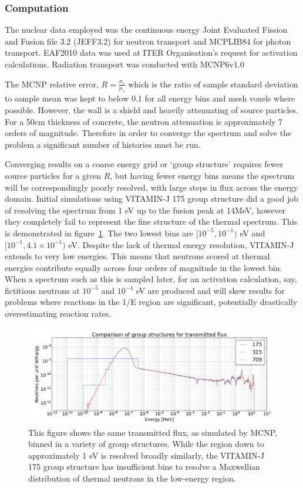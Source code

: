 \subsubsection{Computation}
\label{subsubsec:rad_tran_comp}
The nuclear data employed was the continuous energy Joint Evaluated Fission and Fusion file 3.2 (JEFF3.2) for neutron transport and MCPLIB84 for photon transport. EAF2010 data was used at ITER Organisation's request for activation calculations. Radiation transport was conducted with MCNP6v1.0

The MCNP relative error, $R = \frac{\sigma_{s}}{\mu_{s}}$ which is the ratio of sample standard deviation to sample mean was kept to below 0.1 for all energy bins and mesh voxels where possible. However, the wall is a shield and heavily attenuating of source particles. For a 50cm thickness of concrete, the neutron attenuation is approximately 7 orders of magnitude. Therefore in order to converge the spectrum and solve the problem a significant number of histories must be run. 

Converging results on a coarse energy grid or `group structure' requires fewer source particles for a given $R$, but having fewer energy bins means the spectrum will be correspondingly poorly resolved, with large steps in flux across the energy domain. Initial simulations using VITAMIN-J 175 group structure did a good job of resolving the spectrum from 1 eV up to the fusion peak at 14MeV, however they completely fail to represent the fine structure of the thermal spectrum. This is demonstrated in figure~\ref{fig:neutron_group_comparison}. The two lowest bins are $[10^{-5},10^{-1})$ eV and $[10^{-1},4.1\times10^{-1})$ eV. Despite the lack of thermal energy resolution, VITAMIN-J extends to very low energies. This means that neutrons scored at thermal energies contribute equally across four orders of magnitude in the lowest bin. When a spectrum such as this is sampled later, for an activation calculation, say, fictitious neutrons at $10^{-5}$ and $10^{-4}$ eV are produced and will skew results for problems where reactions in the 1/E region are significant, potentially drastically overestimating reaction rates. 

\begin{figure}[H]
  \includegraphics[width=\textwidth]{shield_flux_by_group.png}
  \caption{This figure shows the same transmitted flux, as simulated by MCNP, binned in a variety of group structures. While the region down to approximately 1 eV is resolved broadly similarly, the VITAMIN-J 175 group structure has insufficient bins to resolve a Maxwellian distribution of thermal neutrons in the low-energy region.}
  \label{fig:neutron_group_comparison}
\end{figure}

